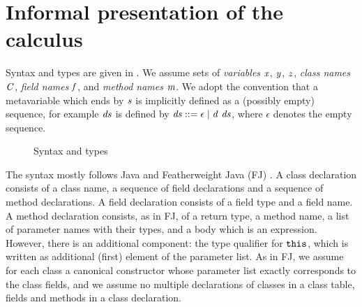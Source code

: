 \section{Informal presentation of the {calculus}}\label{sect:informal}
Syntax and types are given in .  We assume sets of \emph{variables} $\mathit{x}$, $\mathit{y}$, $\mathit{z}$, \emph{class names} $\mathit{C}$, \emph{field names} $\mathit{f}$, and \emph{method names} $\mathit{m}$. 
We adopt the convention that a metavariable which ends by $\mathit{s}$ is implicitly defined as a (possibly empty) sequence, {for example} {$\mathit{ds}$ is defined by $\produzioneinline{\decs}{\epsilon\mid \dec\ \decs}$}, where $\epsilon$ denotes the empty sequence.

\begin{figure}
\caption{Syntax and types}\label{fig:syntax}
\end{figure}

The syntax mostly follows Java and Featherweight Java (FJ) \cite{IgarashiEtAl01}. A class declaration consists of a class name, a sequence of field declarations and a sequence of method declarations. A field declaration consists of a field type and a field name.
 A method declaration consists, as in FJ, of a return type, a method name, a list of parameter names with their types, and a body which is an expression. {However, there is an additional component: the type qualifier for $\texttt{this}$, which is {written as additional (first) element of the parameter list}.}
  As in FJ, we assume for each class a canonical constructor whose parameter list exactly corresponds to the class fields, and we assume no multiple declarations of classes in a class table, fields and methods in a class declaration. 

